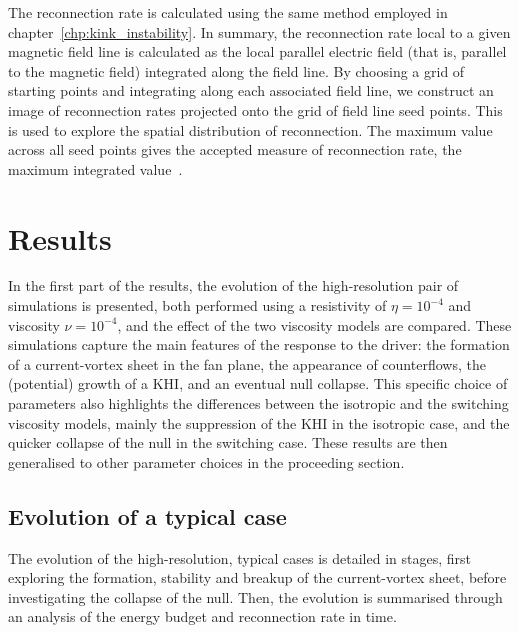 The reconnection rate is calculated using the same method employed in chapter~\ref{chp:kink_instability}. In summary, the reconnection rate local to a given magnetic field line is calculated as the local parallel electric field (that is, parallel to the magnetic field) integrated along the field line. By choosing a grid of starting points and integrating along each associated field line, we construct an image of reconnection rates projected onto the grid of field line seed points. This is used to explore the spatial distribution of reconnection. The maximum value across all seed points gives the accepted measure of reconnection rate, the maximum integrated value~\cite{galsgaardSteadyStateReconnection2011,priestNatureThreedimensionalMagnetic2003,schindlerGeneralMagneticReconnection1988}.

\section{Results}

\label{sec:khi_results}

In the first part of the results, the evolution of the high-resolution pair of simulations is presented, both performed using a resistivity of $\eta = 10^{-4}$ and viscosity $\nu = 10^{-4}$, and the effect of the two viscosity models are compared. These simulations capture the main features of the response to the driver: the formation of a current-vortex sheet in the fan plane, the appearance of counterflows, the (potential) growth of a KHI, and an eventual null collapse. This specific choice of parameters also highlights the differences between the isotropic and the switching viscosity models, mainly the suppression of the KHI in the isotropic case, and the quicker collapse of the null in the switching case. These results are then generalised to other parameter choices in the proceeding section.

\subsection{Evolution of a typical case}
\label{sec:null_point_khi_single_case}

The evolution of the high-resolution, typical cases is detailed in stages, first exploring the formation, stability and breakup of the current-vortex sheet, before investigating the collapse of the null. Then, the evolution is summarised through an analysis of the energy budget and reconnection rate in time.

